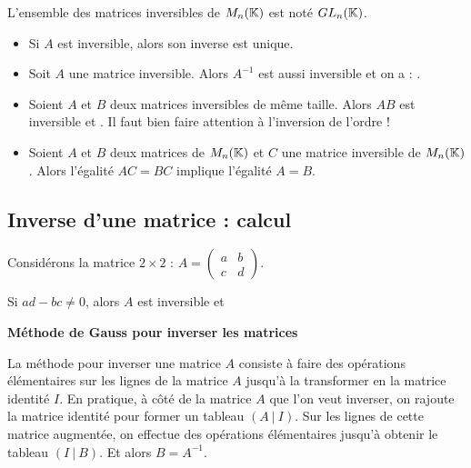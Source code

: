\documentclass[10pt,class=article,crop=false]{standalone}
\begin{document}
\begin{multicols}{2}
L'ensemble des matrices inversibles de $M_{n}(\mathbb{K})$ est noté
$GL_{n}(\mathbb{K})$.


\begin{proposition}
\sauteligne
\begin{itemize}
	\item Si $A$ est inversible, alors son inverse est unique.
	
	\item Soit $A$ une matrice inversible. Alors
	$A^{-1}$ est aussi inversible et on a :
	.
	
	\item Soient $A$ et $B$ deux matrices inversibles de même taille. Alors
	$AB$ est inversible et
	.
	Il faut bien faire attention à l'inversion de l'ordre !
	
	\item Soient $A$ et $B$ deux matrices de $M_{n}(\mathbb{K})$ et $C$ une matrice
	inversible de $M_{n}(\mathbb{K})$.
	Alors l'égalité $AC=BC$ implique l'égalité $A=B$.
	
\end{itemize}
\end{proposition}



\subsection{Inverse d'une matrice : calcul}

Considérons la matrice $2\times 2$ :
$A = \begin{pmatrix}
	a & b\\
	c & d
\end{pmatrix}.
$
\begin{proposition}
	
	Si $ad - bc \not= 0$,  alors $A$ est inversible et
\end{proposition}


\textbf{Méthode de Gauss pour inverser les matrices}

La méthode pour inverser une matrice $A$
consiste à faire des opérations élémentaires sur les lignes de la matrice $A$
jusqu'à la transformer en la matrice identité $I$.
En pratique,
à côté de la matrice $A$ que l'on veut inverser, on rajoute la matrice identité
pour former un tableau $(A\ |\ I)$.
Sur les lignes de cette matrice augmentée, on effectue des opérations
élémentaires jusqu'à obtenir
le tableau $(I\ |\ B)$. Et alors $B=A^{-1}$.


\end{multicols}
\end{document}
